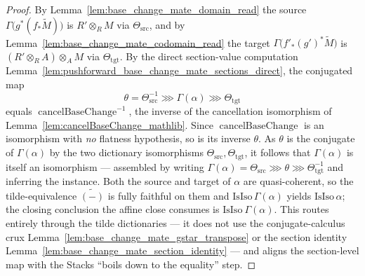 \begin{proof}
  By Lemma~\ref{lem:base_change_mate_domain_read} the
  source \(\Gamma\bigl(g^*(f_*\widetilde M)\bigr)\) is \(R' \otimes_R M\) via
  \(\Theta_{\mathrm{src}}\), and by Lemma~\ref{lem:base_change_mate_codomain_read} the
  target \(\Gamma\bigl(f'_*(g')^*\widetilde M\bigr)\) is \((R' \otimes_R A) \otimes_A M\)
  via \(\Theta_{\mathrm{tgt}}\). By the direct section-value computation
  Lemma~\ref{lem:pushforward_base_change_mate_sections_direct}, the conjugated map
  \[
    \theta = \Theta_{\mathrm{src}}^{-1} \ggg \Gamma(\alpha) \ggg \Theta_{\mathrm{tgt}}
  \]
  equals \(\operatorname{cancelBaseChange}^{-1}\), the inverse of the cancellation
  isomorphism of Lemma~\ref{lem:cancelBaseChange_mathlib}. Since
  \(\operatorname{cancelBaseChange}\) is an isomorphism with \emph{no} flatness
  hypothesis, so is its inverse \(\theta\). As \(\theta\) is the conjugate of
  \(\Gamma(\alpha)\) by the two dictionary isomorphisms
  \(\Theta_{\mathrm{src}}, \Theta_{\mathrm{tgt}}\), it follows that \(\Gamma(\alpha)\) is
  itself an isomorphism — assembled by writing
  \(\Gamma(\alpha) = \Theta_{\mathrm{src}} \ggg \theta \ggg \Theta_{\mathrm{tgt}}^{-1}\)
  and inferring the instance. Both the source and target of \(\alpha\) are
  quasi-coherent, so the tilde-equivalence \(\widetilde{(-)}\) is fully faithful on
  them and \(\mathrm{IsIso}\,\Gamma(\alpha)\) yields \(\mathrm{IsIso}\,\alpha\); the
  closing conclusion the affine close consumes is \(\mathrm{IsIso}\ \Gamma(\alpha)\).
  This routes entirely through the tilde dictionaries — it does not use the
  conjugate-calculus crux Lemma~\ref{lem:base_change_mate_gstar_transpose} or the
  section identity Lemma~\ref{lem:base_change_mate_section_identity} — and aligns the
  section-level map with the Stacks ``boils down to the equality'' step.
\end{proof}

